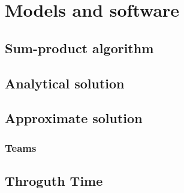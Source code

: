 \documentclass[article]{jss}
\begin{document}
\newpage



% 
% 
% 
% 
% 






\section{Models and software} 

\subsection{Sum-product algorithm} \label{sec:sumProductAlgorithm}

\subsection{Analytical solution} \label{sec:analyticalSolution}

\subsection{Approximate solution} \label{sec:approximateSolution}
\subsubsection{Teams}

\subsection{Throguth Time} \label{sec:throguthTime}
\end{document}

